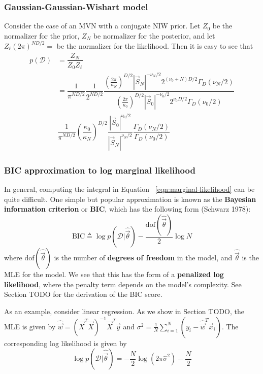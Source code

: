 \subsubsection{Gaussian-Gaussian-Wishart model}
Consider the case of an MVN with a conjugate NIW prior. Let $Z_0$ be the normalizer for the prior, $Z_N$ be normalizer for the posterior, and let $Z_{\ell}(2\pi)^{ND/2}=$ be the normalizer for the likelihood. Then it is easy to see that
\begin{align}
p(\mathcal{D})& =\dfrac{Z_N}{Z_0Z_{\ell}} \\
   & = \dfrac{1}{\pi^{ND/2}}\dfrac{1}{2^{ND/2}}\dfrac{\left(\frac{2\pi}{\kappa_N}\right)^{D/2}|\vec{S}_N|^{-\nu_N/2}2^{(\nu_0+N)D/2}\Gamma_D(\nu_N/2)}{\left(\frac{2\pi}{\kappa_0}\right)^{D/2}|\vec{S}_0|^{-\nu_0/2}2^{\nu_0D/2}\Gamma_D(\nu_0/2)} \\
   & \dfrac{1}{\pi^{ND/2}}\left(\dfrac{\kappa_0}{\kappa_N}\right)^{D/2}\dfrac{|\vec{S}_0|^{\nu_0/2}}{|\vec{S}_N|^{\nu_N/2}}\dfrac{\Gamma_D(\nu_N/2)}{\Gamma_D(\nu_0/2)}
\end{align}

\subsubsection{BIC approximation to log marginal likelihood}
In general, computing the integral in Equation ~\eqref{eqn:marginal-likelihood} can be quite difficult. One simple but popular approximation is known as the \textbf{Bayesian information criterion} or \textbf{BIC}, which has the following form (Schwarz 1978):
\begin{equation}
\mathrm{BIC} \triangleq \log p(\mathcal{D}|\hat{\vec{\theta}})-\dfrac{\mathrm{dof}(\hat{\vec{\theta}})}{2}\log{N}
\end{equation}
where $\mathrm{dof}(\hat{\vec{\theta}})$ is the number of \textbf{degrees of freedom} in the model, and $\hat{\vec{\theta}}$ is the MLE for the model. We see that this has the form of a \textbf{penalized log likelihood}, where the penalty term depends on the model’s complexity. See Section TODO for the derivation of the BIC score.

As an example, consider linear regression. As we show in Section TODO, the MLE is given by $\hat{\vec{w}}=(\vec{X}^T\vec{X})^{-1}\vec{X}^T\vec{y}$ and $\sigma^2=\frac{1}{N}\sum_{i=1}^N (y_i-\hat{\vec{w}}^T\vec{x}_i)$. The corresponding log likelihood is given by
\begin{equation}
\log p(\mathcal{D}|\hat{\vec{\theta}}) = -\dfrac{N}{2}\log(2\pi\hat{\sigma}^2)-\dfrac{N}{2}
\end{equation}


